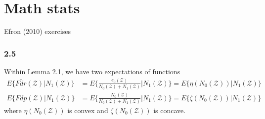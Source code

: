 \documentclass{article}\usepackage{graphicx, color}
\begin{document}
\section*{Math stats}
Efron (2010) exercises

\subsubsection*{2.5}
Within Lemma 2.1, we have two expectations of functions
\begin{displaymath}
\begin{split}
E\{\overline{Fdr}(\mathcal{Z}) | N_1(\mathcal{Z})\} 
& = E\{ \frac{e_0(\mathcal{Z})}{N_0(\mathcal{Z}) + N_1(\mathcal{Z})} |N_1(\mathcal{Z})\}
= E\{ \eta(N_0(\mathcal{Z})) | N_1(\mathcal{Z}) \} \\
E\{Fdp(\mathcal{Z}) | N_1(\mathcal{Z})\} 
& = E\{ \frac{N_0(\mathcal{Z})}{N_0(\mathcal{Z}) + N_1(\mathcal{Z})} |N_1(\mathcal{Z})\}
= E\{ \zeta(N_0(\mathcal{Z})) | N_1(\mathcal{Z}) \}
\end{split}
\end{displaymath}
where $\eta(N_0(\mathcal{Z}))$ is convex and $\zeta(N_0(\mathcal{Z}))$
is concave.
\end{document}
